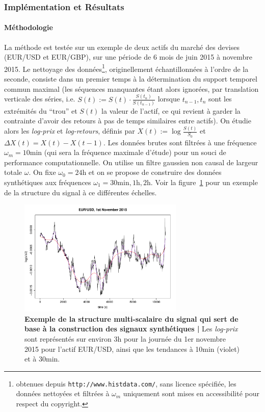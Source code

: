 \subsubsection{Implémentation et Résultats}

\paragraph{Méthodologie}

La méthode est testée sur un exemple de deux actifs du marché des devises (EUR/USD et EUR/GBP), sur une période de 6 mois de juin 2015 à novembre 2015. Le nettoyage des données\footnote{obtenues depuis \texttt{http://www.histdata.com/}, sans licence spécifiée, les données nettoyées et filtrées à $\omega_m$ uniquement sont mises en accessibilité pour respect du copyright.}, originellement échantillonnées à l'ordre de la seconde, consiste dans un premier temps à la détermination du support temporel commun maximal (les séquences manquantes étant alors ignorées, par translation verticale des séries, i.e. $S(t):=S(t)\cdot \frac{S(t_{n})}{S(t_{n-1})}$ lorsque $t_{n-1},t_n$ sont les extrémités du ``trou'' et $S(t)$ la valeur de l'actif, ce qui revient à garder la contrainte d'avoir des retours à pas de temps similaires entre actifs). On étudie alors les \emph{log-prix} et \emph{log-retours}, définis par $X(t):=\log{\frac{S(t)}{S_0}}$ et $\Delta X (t) = X(t) - X(t-1)$. Les données brutes sont filtrées à une fréquence $\omega_m = 10\textrm{min}$ (qui sera la fréquence maximale d'étude) pour un souci de performance computationnelle. On utilise un filtre gaussien non causal de largeur totale $\omega$. On fixe $\omega_0=24\textrm{h}$ et on se propose de construire des données synthétiques aux fréquences $\omega_1 = 30\textrm{min},1\textrm{h},2\textrm{h}$. Voir la figure~\ref{fig:example_signal} pour un exemple de la structure du signal à ce différentes échelles.


\begin{figure}%
\centering
\includegraphics[width=0.7\textwidth]{figures/asset/ex_filtering}
\caption{\textbf{Exemple de la structure multi-scalaire du signal qui sert de base à la construction des signaux synthétiques | } Les \emph{log-prix} sont représentés sur environ 3h pour la journée du 1er novembre 2015 pour l'actif EUR/USD, ainsi que les tendances à 10min (violet) et à 30min.}
\label{fig:example_signal}
\end{figure}



